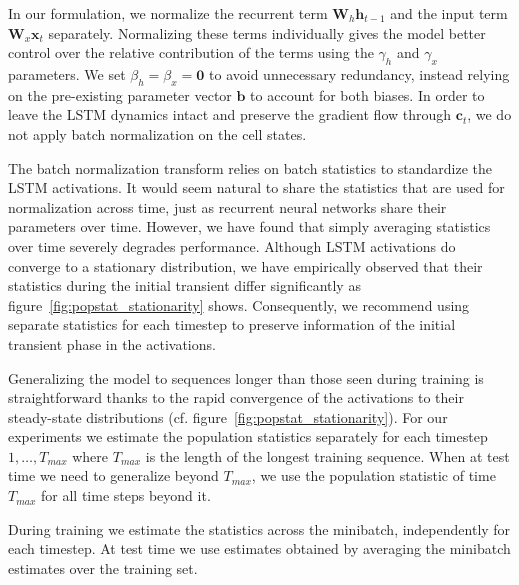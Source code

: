 \documentclass{article} %
\newcommand{\vect}[1]{\mathbf{#1}}
\newcommand{\mat}[1]{\mathbf{#1}}
\begin{document}
In our formulation, we normalize the recurrent term $\mat{W}_h \vect{h}_{t-1}$ and the input term $\mat{W}_x \vect{x}_t$ separately.
Normalizing these terms individually gives the model better control over the relative contribution of the terms using the $\gamma_h$ and $\gamma_x$ parameters.
We set $\beta_h = \beta_x = \vect{0}$ to avoid unnecessary redundancy, instead relying on the pre-existing parameter vector $\vect{b}$ to account for both biases.
In order to leave the LSTM dynamics intact and preserve the gradient flow through $\vect{c}_t$, we do not apply batch normalization on the cell states.


The batch normalization transform relies on batch statistics to standardize the LSTM activations.
It would seem natural to share the statistics that are used for normalization across time,
just as recurrent neural networks share their parameters over time.
However, we have found that simply averaging statistics over time severely degrades performance.
Although LSTM activations do converge to a stationary distribution, we have empirically observed that their statistics during the initial transient differ significantly as figure~\ref{fig:popstat_stationarity} shows.
Consequently, we recommend using separate statistics for each timestep to preserve
information of the initial transient phase in the activations.

Generalizing the model to sequences longer than those seen during training
is straightforward thanks to the rapid convergence of the activations
to their steady-state distributions (cf. figure~\ref{fig:popstat_stationarity}).
For our experiments we estimate the population statistics separately for each timestep $1, \ldots, T_{max}$ where $T_{max}$ is the length of the longest training sequence.
When at test time we need to generalize beyond $T_{max}$, we use the population statistic of time $T_{max}$ for all time steps beyond it.

During training we estimate the statistics across the minibatch, independently for each timestep.
At test time we use estimates obtained by averaging the minibatch estimates over the training set.


\end{document}
